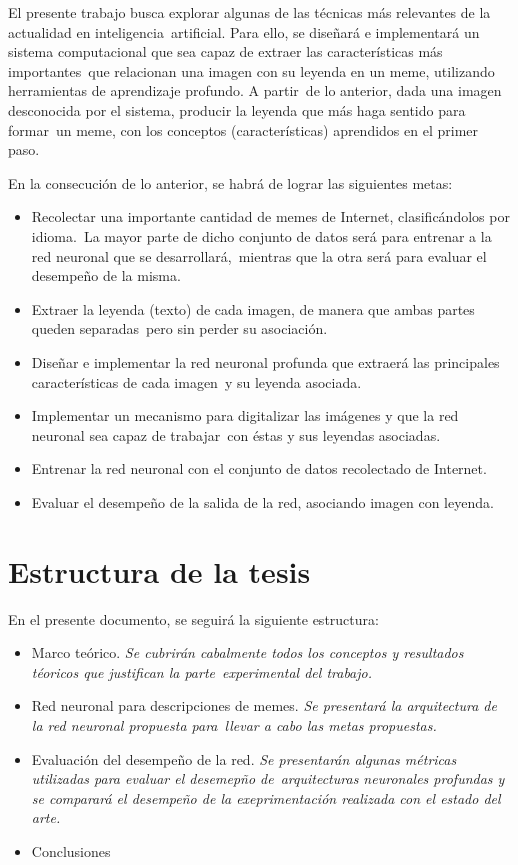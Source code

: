 \noindent
El presente trabajo busca explorar algunas de las técnicas más relevantes de la actualidad en inteligencia\
artificial. Para ello, se diseñará e implementará un sistema computacional que sea capaz de extraer las características más importantes\
que relacionan una imagen con su leyenda en un meme, utilizando herramientas de aprendizaje profundo. A partir\
de lo anterior, dada una imagen desconocida por el sistema, producir la leyenda que más haga sentido para formar\
un meme, con los conceptos (características) aprendidos en el primer paso.\par
En la consecución de lo anterior, se habrá de lograr las siguientes metas:
\begin{itemize}
\item Recolectar una importante cantidad de memes de Internet, clasificándolos por idioma.\
  La mayor parte de dicho conjunto de datos será para entrenar a la red neuronal que se desarrollará,\
  mientras que la otra será para evaluar el desempeño de la misma.
\item Extraer la leyenda (texto) de cada imagen, de manera que ambas partes queden separadas\
  pero sin perder su asociación.
\item Diseñar e implementar la red neuronal profunda que extraerá las principales características de cada imagen\
  y su leyenda asociada.
\item Implementar un mecanismo para digitalizar las imágenes y que la red neuronal sea capaz de trabajar\
  con éstas y sus leyendas asociadas.
\item Entrenar la red neuronal con el conjunto de datos recolectado de Internet.
\item Evaluar el desempeño de la salida de la red, asociando imagen con leyenda.
\end{itemize}

\section{Estructura de la tesis}

\noindent
En el presente documento, se seguirá la siguiente estructura:
\begin{itemize}
\item Marco teórico. \emph{Se cubrirán cabalmente todos los conceptos y resultados téoricos que justifican la parte}\
  \emph{experimental del trabajo.}
\item Red neuronal para descripciones de memes. \emph{Se presentará la arquitectura de la red neuronal propuesta para}\
  \emph{llevar a cabo las metas propuestas.}
\item Evaluación del desempeño de la red. \emph{Se presentarán algunas métricas utilizadas para evaluar el desemepño de}\
  \emph{arquitecturas neuronales profundas y se comparará el desempeño de la exeprimentación realizada con el estado del arte.}
\item Conclusiones
\end{itemize}
